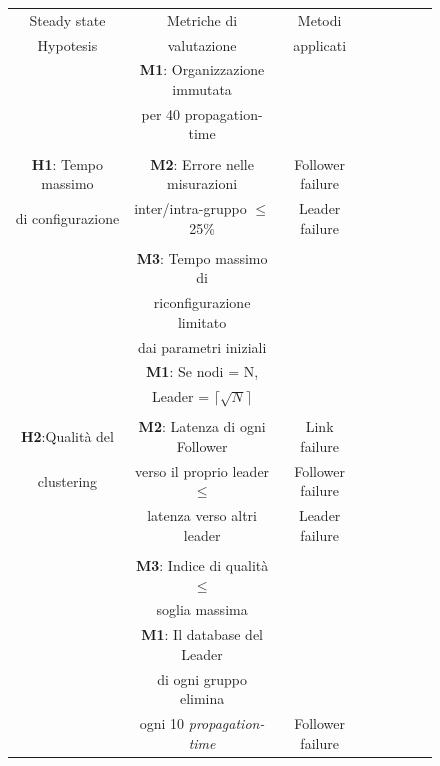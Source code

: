     \begin{figure} [H]
        \begin{center}
            \begin{center}
                \begin{tabular}{|c|c|c|c|c|c|c|c|}
                    \hline
                    Steady state & Metriche di & Metodi\\
                    Hypotesis & valutazione & applicati\\
                    \hline
                    & \textbf{M1}: Organizzazione immutata  & \\
                    & per 40 propagation-time &\\
                    &&\\
                    \textbf{H1}: Tempo massimo & \textbf{M2}: Errore nelle misurazioni & Follower failure\\
                    di configurazione & inter/intra-gruppo $\leq$ 25\% & Leader failure\\
                    &&\\
                    & \textbf{M3}: Tempo massimo di &\\
                    & riconfigurazione limitato &\\
                    & dai parametri iniziali &\\
                    \hline
                    & \textbf{M1}: Se nodi = N, & \\
                    & Leader = $\lceil\sqrt{N}\rceil$ & \\
                    &&\\
                    \textbf{H2}:Qualità del & \textbf{M2}: Latenza di ogni Follower & Link failure\\
                    clustering & verso il proprio leader $\leq$ & Follower failure\\
                    & latenza verso altri leader & Leader failure\\
                    &&\\
                    & \textbf{M3}: Indice di qualità $\leq$ &\\
                    & soglia massima &\\
                    \hline
                    & \textbf{M1}: Il database del Leader  & \\
                    & di ogni gruppo elimina  & \\
                    & ogni 10 \textit{propagation-time} & Follower failure\\

\end{tabular}
\end{center}
\end{center}
\end{figure}
